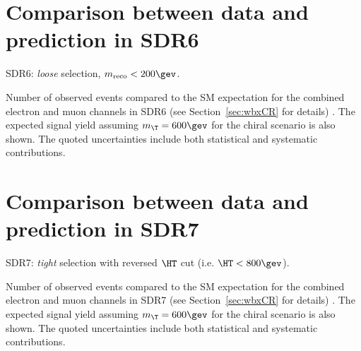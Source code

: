 \clearpage

%


\clearpage

\section{Comparison between data and prediction in SDR6}
\label{sec:DataMC_CR6}

SDR6: {\sl loose} selection, $m_{\rm reco}<200\gev$. 

\begin{table}[h!]
\begin{center}

\caption{\small{Number of observed events compared to the SM expectation for
the combined electron and muon channels in SDR6 (see Section~\ref{sec:wbxCR} for details) . 
The expected signal yield assuming $m_{\T}=600\gev$ for the chiral scenario is also shown. 
The quoted uncertainties include both statistical and systematic contributions.}}
\label{tab:CR6_1W_evtable}
\end{center}
\end{table}

\clearpage

%


\clearpage

\section{Comparison between data and prediction in SDR7}
\label{sec:DataMC_CR7}

SDR7: {\sl tight} selection with reversed $\HT$ cut (i.e. $\HT<800\gev$).

\begin{table}[h!]
\begin{center}

\caption{\small{Number of observed events compared to the SM expectation for
the combined electron and muon channels in SDR7 (see Section~\ref{sec:wbxCR} for details) . 
The expected signal yield assuming $m_{\T}=600\gev$ for the chiral scenario is also shown. 
The quoted uncertainties include both statistical and systematic contributions.}}
\label{tab:CR7_1W_evtable}
\end{center}
\end{table}

